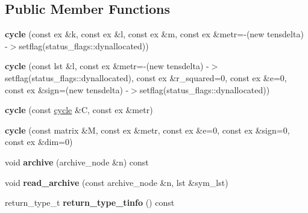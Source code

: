 \subsection*{Public Member Functions}
\begin{DoxyCompactItemize}
\item 
\mbox{\label{class_moeb_inv_1_1cycle_a78031f0e80e19a78bb70f935625ba502}} 
{\bfseries cycle} (const ex \&k, const ex \&l, const ex \&m, const ex \&metr=-\/(new tensdelta) -\/$>$setflag(status\+\_\+flags\+::dynallocated))
\item 
\mbox{\label{class_moeb_inv_1_1cycle_af3ca82bb271f3e385dd0c9fafdc3301d}} 
{\bfseries cycle} (const lst \&l, const ex \&metr=-\/(new tensdelta) -\/$>$setflag(status\+\_\+flags\+::dynallocated), const ex \&r\+\_\+squared=0, const ex \&e=0, const ex \&sign=(new tensdelta) -\/$>$setflag(status\+\_\+flags\+::dynallocated))
\item 
\mbox{\label{class_moeb_inv_1_1cycle_a1835d79b682221e47f61624c1f7a7e13}} 
{\bfseries cycle} (const \mbox{\hyperlink{class_moeb_inv_1_1cycle}{cycle}} \&C, const ex \&metr)
\item 
\mbox{\label{class_moeb_inv_1_1cycle_a94c5100bdf9313bed7b7a1c9de4d9981}} 
{\bfseries cycle} (const matrix \&M, const ex \&metr, const ex \&e=0, const ex \&sign=0, const ex \&dim=0)
\item 
\mbox{\label{class_moeb_inv_1_1cycle_a0f49093aa98601b3ebb17c1bd579b0d5}} 
void {\bfseries archive} (archive\+\_\+node \&n) const
\item 
\mbox{\label{class_moeb_inv_1_1cycle_a6f81f776de51f55909b0f3804c9cf14c}} 
void {\bfseries read\+\_\+archive} (const archive\+\_\+node \&n, lst \&sym\+\_\+lst)
\item 
\mbox{\label{class_moeb_inv_1_1cycle_a6ce1f343ad58eef0b8278dc5e06777b7}} 
return\+\_\+type\+\_\+t {\bfseries return\+\_\+type\+\_\+tinfo} () const
\item 
\mbox{\label{class_moeb_inv_1_1cycle_a7218fc5ee59dd5bbbb18bf1f609cb187}} 

\end{DoxyCompactItemize}
